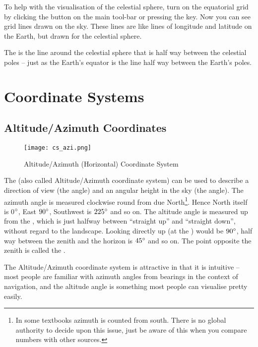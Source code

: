 To help with the visualisation of the celestial sphere, turn on the
equatorial grid by clicking the button on the main tool-bar or pressing
the  key. Now you can see grid lines drawn on the sky. These
lines are like lines of longitude and latitude on the Earth, but drawn
for the celestial sphere.

The  is the line around the celestial sphere
that is half way between the celestial poles -- just as the Earth's
equator is the line half way between the Earth's poles.




\section{Coordinate Systems}
\label{sec:Concepts:CoordinateSystems}

\subsection{Altitude/Azimuth Coordinates}
\label{sec:Concepts:AltAz}

\begin{figure}[ht]
\centering\texttt{[image: cs\_azi.png]}
\caption{Altitude/Azimuth (Horizontal) Coordinate System}
\label{fig:AltAz}
\end{figure}

The 
 (also called Altitude/Azimuth 
coordinate system) can be used to describe a
direction of view (the  angle) and an angular
height in the sky (the  angle). The azimuth angle
is measured clockwise round from due North\footnote{In some textbooks
  azimuth is counted from south. There is no global authority to
  decide upon this issue, just be aware of this when you compare
  numbers with other sources.}. Hence North itself is 0$\degree$, East
$90\degree$, Southwest is $225\degree$ and so on.  The altitude angle
is measured up from the , which is
just halfway between ``straight up'' and ``straight down'', without
regard to the landscape. Looking directly up (at the
) would be $90\degree$, half way between the zenith
and the horizon is $45\degree$ and so on. The point opposite the
zenith is called the .

The Altitude/Azimuth coordinate system is attractive in that it is
intuitive -- most people are familiar with azimuth angles from bearings
in the context of navigation, and the altitude angle is something most
people can visualise pretty easily.

